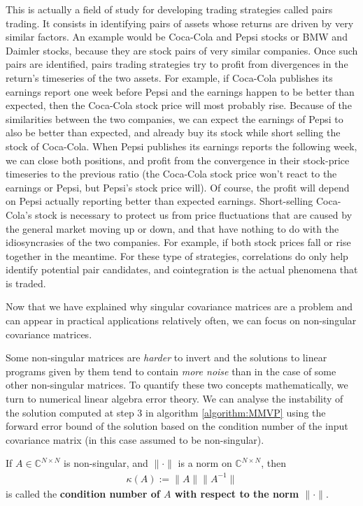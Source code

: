 \begin{enumerate}
    	    This is actually a field of study for developing trading strategies called pairs trading. It consists in identifying pairs of assets whose returns are driven by very similar factors. An example would be Coca-Cola and Pepsi stocks or BMW and Daimler stocks, because they are stock pairs of very similar companies. Once such pairs are identified, pairs trading strategies try to profit from divergences in the return's timeseries of the two assets. For example, if Coca-Cola publishes its earnings report one week before Pepsi and the earnings happen to be better than expected, then the Coca-Cola stock price will most probably rise. Because of the similarities between the two companies, we can expect the earnings of Pepsi to also be better than expected, and already buy its stock while short selling the stock of Coca-Cola. When Pepsi publishes its earnings reports the following week, we can close both positions, and profit from the convergence in their stock-price timeseries to the previous ratio (the Coca-Cola stock price won't react to the earnings or Pepsi, but Pepsi's stock price will). Of course, the profit will depend on Pepsi actually reporting better than expected earnings. Short-selling Coca-Cola's stock is necessary to protect us from price fluctuations that are caused by the general market moving up or down, and that have nothing to do with the idiosyncrasies of the two companies. For example, if both stock prices fall or rise together in the meantime. For these type of strategies, correlations do only help identify potential pair candidates, and cointegration is the actual phenomena that is traded.
    	\end{enumerate}
    	
    	Now that we have explained why singular covariance matrices are a problem and can appear in practical applications relatively often, we can focus on non-singular covariance matrices.
    	
    	Some non-singular matrices are \textit{harder} to invert and the solutions to linear programs given by them tend to contain \textit{more noise} than in the case of some other non-singular matrices. To quantify these two concepts mathematically, we turn to numerical linear algebra error theory. We can analyse the instability of the solution computed at step 3 in algorithm \ref{algorithm:MMVP} using the forward error bound of the solution based on the condition number of the input covariance matrix (in this case assumed to be non-singular).
    	
    	\begin{definition}
    	    If $A \in \mathbb{C}^{N \times N}$ is non-singular, and $\| \cdot \|$ is a norm on $\mathbb{C}^{N \times N}$, then
    	    \begin{align*}
    	        \kappa(A) := \| A \| \| A^{-1} \|
    	    \end{align*}
    	    is called the \textbf{condition number of $A$ with respect to the norm $\| \cdot \|$}.
    	\end{definition}
    	
